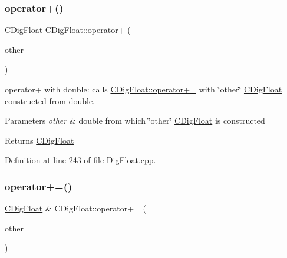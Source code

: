 \mbox{\label{classCDigFloat_a7fd363bbeb039e11fcc2d1b0ca628173}} 
\subsubsection{\texorpdfstring{operator+()}{operator+()}\hspace{0.1cm}{\footnotesize\ttfamily [2/2]}}
{\footnotesize\ttfamily \hyperlink{classCDigFloat}{C\+Dig\+Float} C\+Dig\+Float\+::operator+ (\begin{DoxyParamCaption}\item[{const double}]{other }\end{DoxyParamCaption})}



operator+ with double\+: calls \hyperlink{classCDigFloat_a84b2ad9b4d1a75aae261074ed7c6fefe}{C\+Dig\+Float\+::operator+=} with \char`\"{}other\char`\"{} \hyperlink{classCDigFloat}{C\+Dig\+Float} constructed from double. 


\begin{DoxyParams}{Parameters}
{\em other} & double from which \char`\"{}other\char`\"{} \hyperlink{classCDigFloat}{C\+Dig\+Float} is constructed \\
\hline
\end{DoxyParams}
\begin{DoxyReturn}{Returns}
\hyperlink{classCDigFloat}{C\+Dig\+Float} 
\end{DoxyReturn}


Definition at line 243 of file Dig\+Float.\+cpp.

\mbox{\label{classCDigFloat_a84b2ad9b4d1a75aae261074ed7c6fefe}} 
\subsubsection{\texorpdfstring{operator+=()}{operator+=()}\hspace{0.1cm}{\footnotesize\ttfamily [1/2]}}
{\footnotesize\ttfamily \hyperlink{classCDigFloat}{C\+Dig\+Float} \& C\+Dig\+Float\+::operator+= (\begin{DoxyParamCaption}\item[{const \hyperlink{classCDigFloat}{C\+Dig\+Float} \&}]{other }\end{DoxyParamCaption})}



